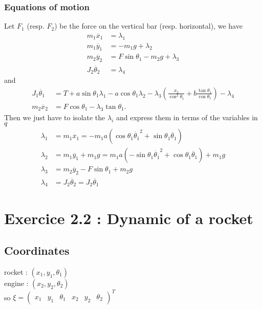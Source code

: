 \subsubsection{Equations of motion}
Let $F_1$ (resp. $F_2$) be the force on the vertical bar (resp. horizontal), we have
\begin{align*}
m_1\ddot{x_1} &= \lambda_1\\
m_1\ddot{y_1} &= -m_1 g + \lambda_2\\
m_2\ddot{y_2} &= F\sin\theta_1 - m_2 g +\lambda_3 \\
J_2\ddot{\theta_2} &= \lambda_4
\end{align*}
and
\begin{align*}
J_1 \ddot{\theta_1} &= T + a \sin\theta_1 \lambda_1 - a \cos\theta_1 \lambda_2 - \lambda_3 \left(\frac{x_2}{\cos^2\theta_1} + b\frac{\tan \theta_1}{\cos\theta_1}\right) - \lambda_4\\
m_2\ddot{x_2} &= F \cos \theta_1 - \lambda_3 \tan \theta_1.
\end{align*}
Then we just have to isolate the $\lambda_i$ and express them in terms of the variables in $q$
\begin{align*}
\lambda_1 &= m_1\ddot{x_1} = -m_1a (\cos\theta_1 \dot{\theta_1}^2 + \sin\theta_1 \ddot{\theta_1})\\
\lambda_2 &= m_1\ddot{y_1} + m_1 g = m_1a (-\sin\theta_1 \dot{\theta_1}^2 + \cos\theta_1 \ddot{\theta_1}) + m_1g\\
\lambda_3 &= m_2\ddot{y_2} - F\sin\theta_1 + m_2 g\\
\lambda_4 &= J_2\ddot{\theta_2} = J_2\ddot{\theta_1}
\end{align*}



\section{Exercice 2.2 : Dynamic of a rocket}

\subsection{Coordinates} rocket : $(x_1, y_1, \theta_1)$ \\
engine : $(x_2, y_2, \theta_2)$ \\
so $\xi = \left( \begin{array}{cccccc}
x_1 &  y_1 & \theta_1 & x_2 & y_2 & \theta_2
\end{array} \right)^T$

